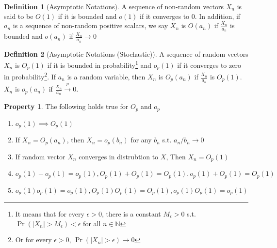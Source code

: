 \documentclass[12pt]{article}
\theoremstyle{definition}
\newtheorem{definition}{Definition}[section]
\theoremstyle{property}
\newtheorem{property}{Property}[section]
\theoremstyle{example}
\begin{document}
\begin{mdframed}[backgroundcolor=blue!5] 
\begin{definition}[Asymptotic Notations]
A sequence of non-random vectors $X_n$ is said to be $O(1)$ if it is bounded and $o(1)$ if it converges to 0. In addition, if $a_n$ is a sequence of non-random positive scalars, we say $X_n$ is $O(a_n)$ if $\frac{X_n}{a_n}$ is bounded and $o(a_n)$ if $\frac{X_n}{a_n}\to0$
\end{definition}
\begin{definition}[Asymptotic Notations (Stochastic)]
A sequence of random vectors $X_n$ is $O_p(1)$ if it is bounded in probability\footnote{It means that for every $\epsilon>0$, there is a constant $M_\epsilon>0$ s.t. $\Pr(|X_n|>M_\epsilon)< \epsilon$ for all $n\in\mathbb{N}$} and $o_p(1)$ if it converges to zero in probability\footnote{Or for every $\epsilon>0$, $\Pr(|X_n|>\epsilon)\to0$}. If $a_n$ is a random variable, then $X_n$ is $O_p(a_n)$ if $\frac{X_n}{a_n}$ is $O_p(1)$. $X_n$ is $o_p(a_n)$ if $\frac{X_n}{a_n}\xrightarrow{p}0$.
\end{definition}
\begin{property}
The following holds true for $O_p$ and $o_p$
\small{\begin{enumerate}
\item $o_p(1)\implies O_p(1)$
\item If $X_n=O_p(a_n)$, then $X_n=o_p(b_n)$ for any $b_n$ s.t. $a_n/b_n\to0$
\item If random vector $X_n$ converges in distrubtion to $X$, Then $X_n=O_p(1)$
\item $o_p(1)+o_p(1)=o_p(1), O_p(1)+O_p(1)=O_p(1), o_p(1)+O_p(1)=O_p(1)$
\item $o_p(1)o_p(1)=o_p(1), O_p(1)O_p(1)=O_p(1), o_p(1)O_p(1)=o_p(1)$
\end{enumerate}}\normalsize
\end{property}
\end{mdframed} \par
\end{document}
